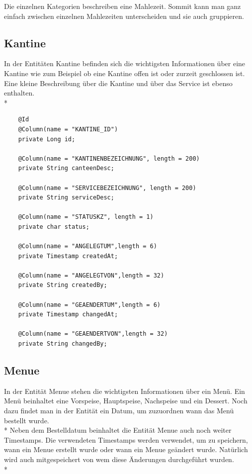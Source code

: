 Die einzelnen Kategorien beschreiben eine Mahlezeit. Sommit kann man ganz einfach zwischen einzelnen Mahlezeiten unterscheiden und sie auch gruppieren.

\subsection{Kantine}

In der Entitäten Kantine befinden sich die wichtigsten Informationen über eine Kantine wie zum Beispiel ob eine Kantine offen ist oder zurzeit geschlossen ist. 
Eine kleine Beschreibung über die Kantine und über das Service ist ebenso enthalten. \\*

\begin{lstlisting}
    @Id
    @Column(name = "KANTINE_ID")
    private Long id;

    @Column(name = "KANTINENBEZEICHNUNG", length = 200)
    private String canteenDesc;

    @Column(name = "SERVICEBEZEICHNUNG", length = 200)
    private String serviceDesc;

    @Column(name = "STATUSKZ", length = 1)
    private char status;

    @Column(name = "ANGELEGTUM",length = 6)
    private Timestamp createdAt;

    @Column(name = "ANGELEGTVON",length = 32)
    private String createdBy;

    @Column(name = "GEAENDERTUM",length = 6)
    private Timestamp changedAt;

    @Column(name = "GEAENDERTVON",length = 32)
    private String changedBy;

\end{lstlisting}

\subsection{Menue}

In der Entität Menue stehen die wichtigsten Informationen über ein Menü. Ein Menü beinhaltet eine Vorspeise, Hauptspeise, Nachspeise und ein Dessert. 
Noch dazu findet man in der Entität ein Datum, um zuzuordnen wann das Menü bestellt wurde. \\*
Neben dem Bestelldatum beinhaltet die Entität Menue auch noch weiter Timestamps.
Die verwendeten Timestamps werden verwendet, um zu speichern, wann ein Menue erstellt wurde oder wann ein Menue geändert wurde. Natürlich wird auch mitgespeichert von wem diese Änderungen durchgeführt wurden. \\*


